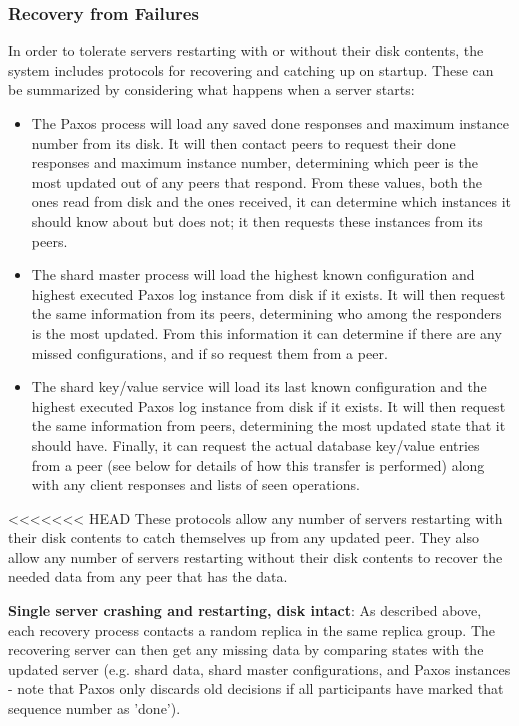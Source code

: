 \documentclass[letterpaper,10pt]{article}
\begin{document}
\begin{itemize}
\subsubsection{Recovery from Failures}
In order to tolerate servers restarting with or without their disk
contents, the system includes protocols for recovering and catching up
on startup.  These can be summarized by considering what happens when
a server starts:

\begin{itemize}
\item The Paxos process will load any saved done responses and maximum
  instance number from its disk.  It will then contact peers to
  request their done responses and maximum instance number,
  determining which peer is the most updated out of any peers that
  respond.  From these values, both the ones read from disk and the
  ones received, it can determine which instances it should know about
  but does not; it then requests these instances from its peers.
\item The shard master process will load the highest known
  configuration and highest executed Paxos log instance from disk if
  it exists.  It will then request the same information from its
  peers, determining who among the responders is the most updated.
  From this information it can determine if there are any missed
  configurations, and if so request them from a peer.
\item The shard key/value service will load its last known
  configuration and the highest executed Paxos log instance from disk
  if it exists.  It will then request the same information from peers,
  determining the most updated state that it should have.  Finally, it
  can request the actual database key/value entries from a peer (see
  below for details of how this transfer is performed) along with any
  client responses and lists of seen operations.
\end{itemize}
<<<<<<< HEAD
These protocols allow any number of servers restarting with their disk contents to catch themselves up from any updated peer.  They also allow any number of servers restarting without their disk contents to recover the needed data from any peer that has the data.

\textbf{Single server crashing and restarting, disk intact}: As described above, each
recovery process contacts a random replica in the same replica group.  The recovering server can then get any missing data by comparing states with the updated server (e.g. shard data, shard master configurations, and Paxos instances - note that Paxos only discards old decisions if all participants have marked that sequence number as 'done').


\end{itemize}
\end{document}
